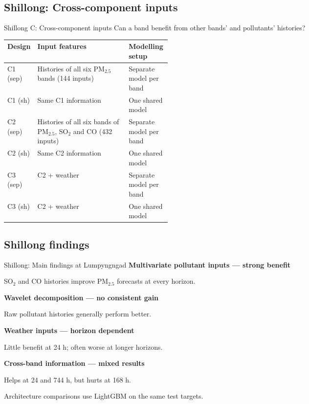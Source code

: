 \subsection{Shillong: Cross-component inputs}
\begin{frame}{Shillong C: Cross-component inputs}
  {\small Can a band benefit from other bands' and pollutants' histories?}\par\medskip
  \scriptsize
  \begin{tabularx}{\linewidth}{@{}p{0.13\linewidth}Xp{0.26\linewidth}@{}}
    \toprule
    Design & Input features & Modelling setup \\
    \midrule
    C1 (sep) & Histories of all six PM$_{2.5}$ bands (144 inputs) & Separate model per band \\[0.5em]
    C1 (sh) & Same C1 information & One shared model \\[0.5em]
    C2 (sep) & Histories of all six bands of PM$_{2.5}$, SO$_2$ and CO (432 inputs) & Separate model per band \\[0.5em]
    C2 (sh) & Same C2 information & One shared model \\[0.5em]
    C3 (sep) & C2 + weather & Separate model per band \\[0.5em]
    C3 (sh) & C2 + weather & One shared model \\
    \bottomrule
  \end{tabularx}
\end{frame}

\subsection{Shillong findings}
\begin{frame}{Shillong: Main findings at Lumpyngngad}
  \small
  \textbf{Multivariate pollutant inputs --- strong benefit}\par
  SO$_2$ and CO histories improve PM$_{2.5}$ forecasts at every horizon.
  \par\medskip
  \textbf{Wavelet decomposition --- no consistent gain}\par
  Raw pollutant histories generally perform better.
  \par\medskip
  \textbf{Weather inputs --- horizon dependent}\par
  Little benefit at 24 h; often worse at longer horizons.
  \par\medskip
  \textbf{Cross-band information --- mixed results}\par
  Helps at 24 and 744 h, but hurts at 168 h.
  \par\medskip
  {\scriptsize Architecture comparisons use LightGBM on the same test targets.}
\end{frame}

